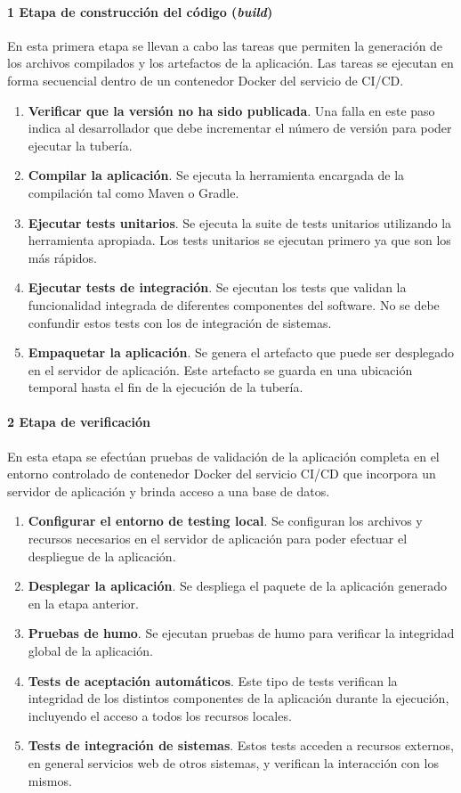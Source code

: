 \paragraph{1 Etapa de construcción del código (\textit{build})}

En esta primera etapa se llevan a cabo las tareas que permiten la generación de los archivos compilados y los artefactos de la aplicación. Las tareas se ejecutan en forma secuencial dentro de un contenedor Docker del servicio de CI/CD.

\begin{enumerate}
\item \textbf{Verificar que la versión no ha sido publicada}. Una falla en este paso indica al desarrollador que debe incrementar el número de versión para poder ejecutar la tubería.
\item \textbf{Compilar la aplicación}. Se ejecuta la herramienta encargada de la compilación tal como Maven o Gradle.
\item \textbf{Ejecutar tests unitarios}. Se ejecuta la suite de tests unitarios utilizando la herramienta apropiada. Los tests unitarios se ejecutan primero ya que son los más rápidos.
\item \textbf{Ejecutar tests de integración}. Se ejecutan los tests que validan la funcionalidad integrada de diferentes componentes del software. No se debe confundir estos tests con los de integración de sistemas.
\item \textbf{Empaquetar la aplicación}. Se genera el artefacto que puede ser desplegado en el servidor de aplicación. Este artefacto se guarda en una ubicación temporal hasta el fin de la ejecución de la tubería.
\end{enumerate}
\paragraph{2 Etapa de verificación}

En esta etapa se efectúan pruebas de validación de la aplicación completa en el entorno controlado de contenedor Docker del servicio CI/CD que incorpora un servidor de aplicación y brinda acceso a una base de datos.

\begin{enumerate}
\item \textbf{Configurar el entorno de testing local}. Se configuran los archivos y recursos necesarios en el servidor de aplicación para poder efectuar el despliegue de la aplicación.
\item \textbf{Desplegar la aplicación}. Se despliega el paquete de la aplicación generado en la etapa anterior.
\item \textbf{Pruebas de humo}. Se ejecutan pruebas de humo para verificar la integridad global de la aplicación.
\item \textbf{Tests de aceptación automáticos}. Este tipo de tests verifican la integridad de los distintos componentes de la aplicación durante la ejecución, incluyendo el acceso a todos los recursos locales.
\item \textbf{Tests de integración de sistemas}. Estos tests acceden a recursos externos, en general servicios web de otros sistemas, y verifican la interacción con los mismos.
\end{enumerate}
